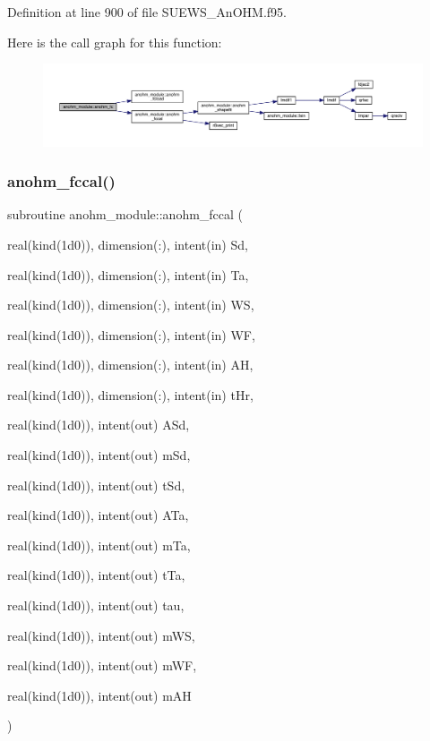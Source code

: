 Definition at line 900 of file S\+U\+E\+W\+S\+\_\+\+An\+O\+H\+M.\+f95.

Here is the call graph for this function\+:\nopagebreak
\begin{figure}[H]
\begin{center}
\leavevmode
\includegraphics[width=350pt]{namespaceanohm__module_aeb3eededd40f7c2bb12213c747c93513_cgraph}
\end{center}
\end{figure}
\mbox{\label{namespaceanohm__module_afed396f8cec94d18f3c6bec4a2a879eb}} 
\subsubsection{\texorpdfstring{anohm\+\_\+fccal()}{anohm\_fccal()}}
{\footnotesize\ttfamily subroutine anohm\+\_\+module\+::anohm\+\_\+fccal (\begin{DoxyParamCaption}\item[{real(kind(1d0)), dimension(\+:), intent(in)}]{Sd,  }\item[{real(kind(1d0)), dimension(\+:), intent(in)}]{Ta,  }\item[{real(kind(1d0)), dimension(\+:), intent(in)}]{WS,  }\item[{real(kind(1d0)), dimension(\+:), intent(in)}]{WF,  }\item[{real(kind(1d0)), dimension(\+:), intent(in)}]{AH,  }\item[{real(kind(1d0)), dimension(\+:), intent(in)}]{t\+Hr,  }\item[{real(kind(1d0)), intent(out)}]{A\+Sd,  }\item[{real(kind(1d0)), intent(out)}]{m\+Sd,  }\item[{real(kind(1d0)), intent(out)}]{t\+Sd,  }\item[{real(kind(1d0)), intent(out)}]{A\+Ta,  }\item[{real(kind(1d0)), intent(out)}]{m\+Ta,  }\item[{real(kind(1d0)), intent(out)}]{t\+Ta,  }\item[{real(kind(1d0)), intent(out)}]{tau,  }\item[{real(kind(1d0)), intent(out)}]{m\+WS,  }\item[{real(kind(1d0)), intent(out)}]{m\+WF,  }\item[{real(kind(1d0)), intent(out)}]{m\+AH }\end{DoxyParamCaption})}



